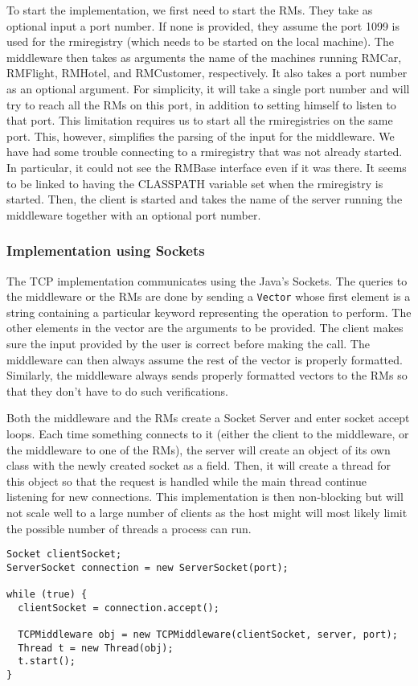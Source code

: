 \documentclass[12pt]{article}
\theoremstyle{plain}%
\theoremstyle{definition}
\theoremstyle{remark}
\newcommand{\java}[1]{{\lstinline!#1!}}
\begin{document}
To start the implementation, we first need to start the RMs. They take
as optional input a port number. If none is provided, they assume the
port 1099 is used for the rmiregistry (which needs to be started on
the local machine). The middleware then takes as arguments the name of
the machines running RMCar, RMFlight, RMHotel, and RMCustomer,
respectively. It also takes a port number as an optional argument. For
simplicity, it will take a single port number and will try to reach
all the RMs on this port, in addition to setting himself to listen to
that port. This limitation requires us to start all the rmiregistries
on the same port. This, however, simplifies the parsing of the input
for the middleware. We have had some trouble connecting to a
rmiregistry that was not already started. In particular, it could not
see the RMBase interface even if it was there. It seems to be linked to
having the CLASSPATH variable set when the rmiregistry is started.
Then, the client is started and takes the name of the server running
the middleware together with an optional port number.

\subsubsection*{Implementation using Sockets}
The TCP implementation communicates using the Java's Sockets. The
queries to the middleware or the RMs are done by sending a
\java{Vector} whose first element is a string containing a particular
keyword representing the operation to perform. The other elements in
the vector are the arguments to be provided. The client makes sure the
input provided by the user is correct before making the call. The
middleware can then always assume the rest of the vector is properly
formatted. Similarly, the middleware always sends properly formatted
vectors to the RMs so that they don't have to do such verifications. 

Both the middleware and the RMs create a Socket Server and enter
socket accept loops. Each time something connects to it (either the
client to the middleware, or the middleware to one of the RMs), the
server will create an object of its own class with the newly created
socket as a field. Then, it will create a thread for this object so
that the request is handled while the main thread continue listening
for new connections. This implementation is then non-blocking but will
not scale well to a large number of clients as the host might will
most likely limit the possible number of threads a process can run.
\begin{lstlisting}
Socket clientSocket;
ServerSocket connection = new ServerSocket(port);

while (true) {
  clientSocket = connection.accept();
  
  TCPMiddleware obj = new TCPMiddleware(clientSocket, server, port);
  Thread t = new Thread(obj);
  t.start();
}
\end{lstlisting}
\end{document}
